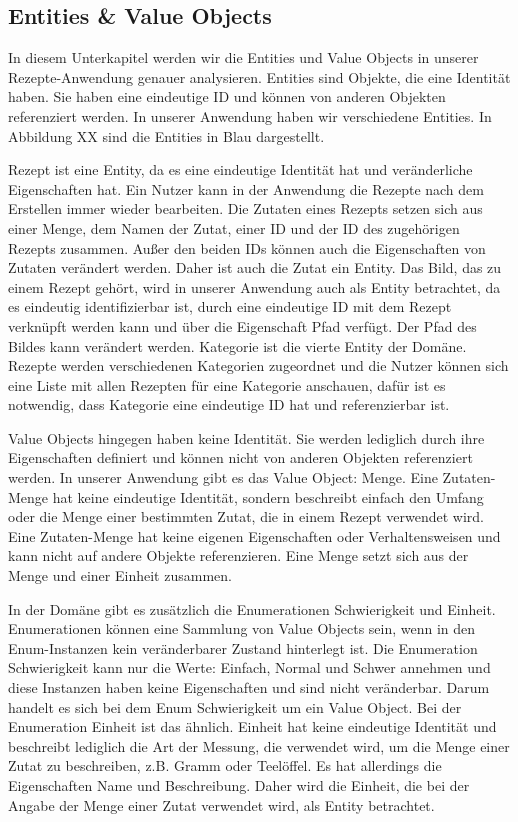 \subsection{Entities \& Value Objects}
In diesem Unterkapitel werden wir die Entities und Value Objects in unserer Rezepte-Anwendung genauer analysieren. Entities sind Objekte, die eine Identität haben. Sie haben eine eindeutige ID und können von anderen Objekten referenziert werden. In unserer Anwendung haben wir verschiedene Entities. In Abbildung XX sind die Entities in Blau dargestellt.

Rezept ist eine Entity, da es eine eindeutige Identität hat und veränderliche Eigenschaften hat. Ein Nutzer kann in der Anwendung die Rezepte nach dem Erstellen immer wieder bearbeiten. Die Zutaten eines Rezepts setzen sich aus einer Menge, dem Namen der Zutat, einer ID und der ID des zugehörigen Rezepts zusammen. Außer den beiden IDs können auch die Eigenschaften von Zutaten verändert werden. Daher ist auch die Zutat ein Entity. Das Bild, das zu einem Rezept gehört, wird in unserer Anwendung auch als Entity betrachtet, da es eindeutig identifizierbar ist, durch eine eindeutige ID mit dem Rezept verknüpft werden kann und über die Eigenschaft Pfad verfügt. Der Pfad des Bildes kann verändert werden. Kategorie ist die vierte Entity der Domäne. Rezepte werden verschiedenen Kategorien zugeordnet und die Nutzer können sich eine Liste mit allen Rezepten für eine Kategorie anschauen, dafür ist es notwendig, dass Kategorie eine eindeutige ID hat und referenzierbar ist.

Value Objects hingegen haben keine Identität. Sie werden lediglich durch ihre Eigenschaften definiert und können nicht von anderen Objekten referenziert werden. In unserer Anwendung gibt es das Value Object: Menge. Eine Zutaten-Menge hat keine eindeutige Identität, sondern beschreibt einfach den Umfang oder die Menge einer bestimmten Zutat, die in einem Rezept verwendet wird. Eine Zutaten-Menge hat keine eigenen Eigenschaften oder Verhaltensweisen und kann nicht auf andere Objekte referenzieren. Eine Menge setzt sich aus der Menge und einer Einheit zusammen. 

In der Domäne gibt es zusätzlich die Enumerationen Schwierigkeit und Einheit. Enumerationen können eine Sammlung von Value Objects sein, wenn in den Enum-Instanzen kein veränderbarer Zustand hinterlegt ist. Die Enumeration Schwierigkeit kann nur die Werte: Einfach, Normal und Schwer annehmen und diese Instanzen haben keine Eigenschaften und sind nicht veränderbar. Darum handelt es sich bei dem Enum Schwierigkeit um ein Value Object. Bei der Enumeration Einheit ist das ähnlich. Einheit hat keine eindeutige Identität und beschreibt lediglich die Art der Messung, die verwendet wird, um die Menge einer Zutat zu beschreiben, z.B. Gramm oder Teelöffel. Es hat allerdings die Eigenschaften Name und Beschreibung. Daher wird die Einheit, die bei der Angabe der Menge einer Zutat verwendet wird, als Entity betrachtet.

